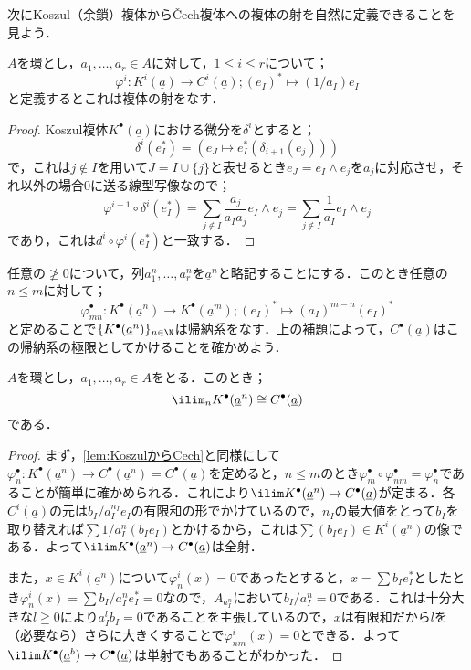次にKoszul（余鎖）複体から\v{C}ech複体への複体の射を自然に定義できることを見よう．

\begin{lem}\label{lem:KoszulからCech}
	$A$を環とし，$a_1,\dots,a_r\in A$に対して，$1\leq i\leq r$について；
	\[\varphi^i:K^i(\underline{a})\to C^i(\underline{a});(e_I)^\ast\mapsto (1/a_I)e_I\]
	と定義するとこれは複体の射をなす．
\end{lem}

\begin{proof}
	Koszul複体$K^\bullet(\underline{a})$における微分を$\delta^i$とすると；\[\delta^i(e_I^\ast)=(e_J\mapsto e_I^\ast(\delta_{i+1}(e_j)))\]
	で，これは$j\not\in I$を用いて$J=I\cup\{j\}$と表せるとき$e_J=e_I\wedge e_j$を$a_j$に対応させ，それ以外の場合$0$に送る線型写像なので；
	\[\varphi^{i+1}\circ\delta^i(e_I^\ast)=\sum_{j\not\in I}\frac{a_j}{a_Ia_j} e_I\wedge e_j=\sum_{j\not\in I} \frac{1}{a_I} e_I\wedge e_j\]
	であり，これは$d^i\circ\varphi^i(e_I^\ast)$と一致する．
\end{proof}

任意の$\ngeq0$について，列$a_1^n,\dots,a_r^n$を$\underline{a}^n$と略記することにする．このとき任意の$n\leq m$に対して；
\[\varphi_{mn}^\bullet:K^\bullet(\underline{a}^n)\to K^\bullet(\underline{a}^m)
;(e_I)^\ast\mapsto(a_I)^{m-n}(e_I)^\ast\]
と定めることで$\{K^\bullet(\underline{a}^n)\}_{n\in\N}$は帰納系をなす．上の補題によって，$C^\bullet(\underline{a})$はこの帰納系の極限としてかけることを確かめよう．

\begin{prop}
	$A$を環とし，$a_1,\dots,a_r\in A$をとる．このとき；
	\[\ilim_{n}K^\bullet(\underline{a}^n)\cong C^\bullet(\underline{a})\]
	である．
\end{prop}

\begin{proof}
	まず，\ref{lem:KoszulからCech}と同様にして$\varphi^\bullet_n:K^\bullet(\underline{a}^n)\to C^\bullet(\underline{a}^n)=C^\bullet(\underline{a})$を定めると，$n\leq m$のとき$\varphi^\bullet_{m}\circ\varphi^\bullet_{nm}=\varphi^\bullet_n$であることが簡単に確かめられる．これにより$\ilim K^\bullet(\underline{a}^n)\to C^\bullet(\underline{a})$が定まる．各$C^i(\underline{a})$の元は$b_I/a_I^{n_I} e_I$の有限和の形でかけているので，$n_I$の最大値をとって$b_I$を取り替えれば$\sum 1/a_I^{n}(b_Ie_I)$とかけるから，これは$\sum(b_Ie_I)\in K^i(\underline{a}^n)$の像である．よって$\ilim K^\bullet(\underline{a}^n)\to C^\bullet(\underline{a})$は全射．
	
	また，$x\in K^i(\underline{a}^n)$について$\varphi^i_n(x)=0$であったとすると，$x=\sum b_Ie_I^\ast$としたとき$\varphi_n^i(x)=\sum b_I/a_I^{n}e_I^\ast=0$なので，$A_{a_I^n}$において$b_I/a_I^n=0$である．これは十分大きな$l\geqq 0$により$a_I^lb_I=0$であることを主張しているので，$x$は有限和だから$l$を（必要なら）さらに大きくすることで$\varphi_{nm}^i(x)=0$とできる．よって$\ilim K^\bullet(\underline{a}^b)\to C^\bullet(\underline{a})$は単射でもあることがわかった．
\end{proof}

